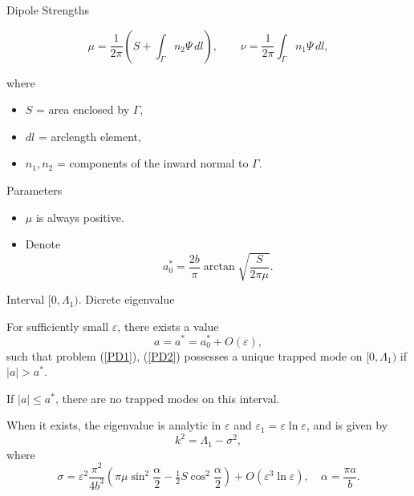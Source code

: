 \documentclass{beamer}
\begin{document}
\begin{frame}{Dipole Strengths}


\begin{equation}\label{mu}
\mu = \frac{1}{2\pi}\left( S + \int_{\Gamma} n_2 \Psi \, dl \right), 
\qquad 
\nu = \frac{1}{2\pi} \int_{\Gamma} n_1 \Psi \, dl,
\end{equation}

where
\begin{itemize}
    \item $S$ = area enclosed by $\Gamma$,
    \item $dl$ = arclength element,
    \item $n_1, n_2$ = components of the inward normal to $\Gamma$.
\end{itemize}

\medskip
\begin{block}{Parameters}
\begin{itemize}
    \item $\mu$ is always positive.  
    \item Denote
    \begin{equation} \label{a_0^ast}
    a_0^{\ast} = \frac{2b}{\pi}\arctan\sqrt{\frac{S}{2\pi \mu}}.
    \end{equation}
\end{itemize}
\end{block}
\end{frame}



\begin{frame}{Interval $[0,\Lambda_1)$. Dicrete eigenvalue}
\begin{theorem}\label{sigma_alpha}
For sufficiently small $\varepsilon$, there exists a value 
\[
a = a^{\ast} = a_0^{\ast} + O(\varepsilon),
\]
such that problem (\ref{PD1}), (\ref{PD2}) possesses a unique trapped mode on $[0,\Lambda_1)$ if $|a| > a^{\ast}$.  

\medskip
If $|a| \leq a^{\ast}$, there are no trapped modes on this interval.  

\medskip
When it exists, the eigenvalue is analytic in $\varepsilon$ and $\varepsilon_1=\varepsilon\ln\varepsilon$, and is given by
\[
k^2 = \Lambda_1 - \sigma^2,
\]
where
\begin{equation}\label{sigmaO(var)}
\sigma = \varepsilon^2 \frac{\pi^2}{4b^3}
\left( \pi\mu \sin^2\frac{\alpha}{2} - \tfrac{1}{2} S \cos^2\frac{\alpha}{2} \right)
+ O(\varepsilon^3 \ln \varepsilon), 
\quad \alpha = \frac{\pi a}{b}.
\end{equation}
\end{theorem}
\end{frame}
\end{document}
